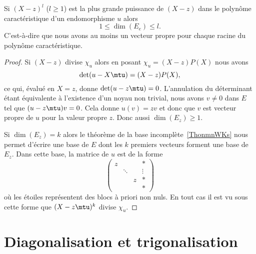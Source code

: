 \begin{proposition}\label{PropooBYZCooBmYLSc}
    Si \( (X-z)^l\) (\( l\geq 1\)) est la plus grande puissance de \( (X-z)\) dans le polynôme caractéristique d'un endomorphisme \( u\) alors
    \begin{equation}
        1\leq \dim(E_e)\leq l.
    \end{equation}
    C'est-à-dire que nous avons au moins un vecteur propre pour chaque racine du polynôme caractéristique.
\end{proposition}

\begin{proof}
    Si $(X-z)$ divise \( \chi_u\) alors en posant \( \chi_u=(X-z)P(X)\) nous avons
    \begin{equation}
        \det(u-X\mtu)=(X-z)P(X),
    \end{equation}
    ce qui, évalué en \( X=z\), donne \( \det(u-z\mtu)=0\). L'annulation du déterminant étant équivalente à l'existence d'un noyau non trivial, nous avons \( v\neq 0\) dans \( E\) tel que \( (u-z\mtu)v=0\). Cela donne \( u(v)=zv\) et donc que \( v\) est vecteur propre de \( u\) pour la valeur propre \( z\). Donc aussi \( \dim(E_z)\geq 1\).

    Si \( \dim(E_z)=k\) alors le théorème de la base incomplète~\ref{ThonmnWKs} nous permet d'écrire une base de \( E\) dont les \( k\) premiers vecteurs forment une base de \( E_z\). Dans cette base, la matrice de \( u\) est de la forme
    \begin{equation}
        \begin{pmatrix}
             z   &       &       &   *    \\
                &   \ddots    &       &   \vdots    \\
                &       &   z    &   *    \\
                &       &       &   *
         \end{pmatrix}
    \end{equation}
    où les étoiles représentent des blocs à priori non nuls. En tout cas il est vu sous cette forme que \( (X-z\mtu)^k\) divise \( \chi_u\).
\end{proof}

\section{Diagonalisation et trigonalisation}

